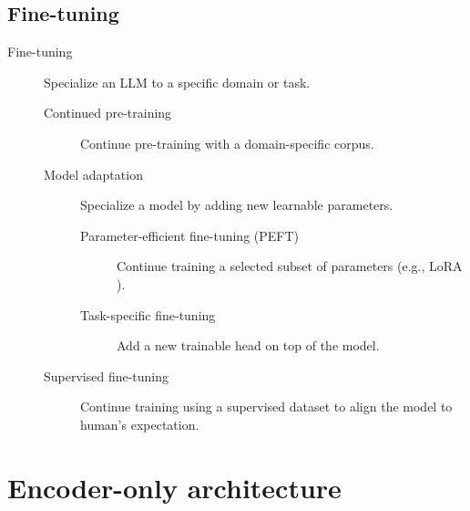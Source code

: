 \subsection{Fine-tuning}

\begin{description}
    \item[Fine-tuning] 
        Specialize an LLM to a specific domain or task.

        \begin{description}
            \item[Continued pre-training] 
                Continue pre-training with a domain-specific corpus.

            \item[Model adaptation]
                Specialize a model by adding new learnable parameters.

                \begin{description}
                    \item[Parameter-efficient fine-tuning (PEFT)] 
                        Continue training a selected subset of parameters (e.g., LoRA ).

                    \item[Task-specific fine-tuning] 
                        Add a new trainable head on top of the model.
                \end{description}

            \item[Supervised fine-tuning] 
                Continue training using a supervised dataset to align the model to human's expectation.
        \end{description}
\end{description}



\section{Encoder-only architecture} \label{sec:mlm}

